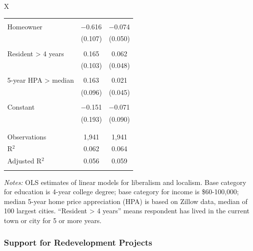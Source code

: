\documentclass[article,11pt]{memoir}
\begin{document}
\begin{table}
\begin{threeparttable}
\begin{tabularx}{\linewidth}{X}
\begin{tabular}{@{\extracolsep{5pt}}lcc}
    & & \\ 
   Homeowner & $-$0.616$^{}$ & $-$0.074 \\ 
    & (0.107) & (0.050) \\ 
    & & \\ 
   Resident > 4 years & 0.165 & 0.062 \\ 
    & (0.103) & (0.048) \\ 
    & & \\ 
   5-year HPA > median & 0.163$^{}$ & 0.021 \\ 
    & (0.096) & (0.045) \\ 
    & & \\ 
   Constant & $-$0.151 & $-$0.071 \\ 
    & (0.193) & (0.090) \\ 
    & & \\ 
  \hline \\[-1.8ex] 
  Observations & 1,941 & 1,941 \\ 
  R$^{2}$ & 0.062 & 0.064 \\ 
  Adjusted R$^{2}$ & 0.056 & 0.059 \\ 
  \hline 
  \hline \\[-1.8ex] 
  \end{tabular} 

  \end{tabularx}
  \begin{tablenotes}[flushleft]
    \item \hspace{-.2em}\emph{Notes:} OLS estimates of linear models for liberalism and localism.  Base category for education is 4-year college degree; base category for income is \$60-100,000; median 5-year home price appreciation (HPA) is based on Zillow data, median of 100 largest cities. ``Resident > 4 years'' means respondent has lived in the current town or city for 5 or more years.
  \end{tablenotes}
  \end{threeparttable}
\end{table}

\subsubsection{Support for Redevelopment Projects}
\end{document}
